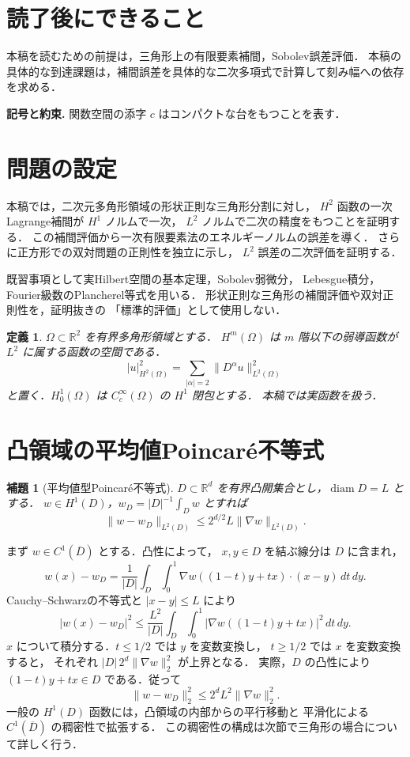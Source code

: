 \documentclass[a5paper,10pt,onecolumn]{jsarticle}
\makeatletter
\theoremstyle{mathnotetheorem}
\newtheorem{definition}[theorem]{定義}
\newtheorem{lemma}[theorem]{補題}
\renewcommand{\proofname}{証明}
\renewenvironment{proof}[1][\proofname]{%
  \par\pushQED{\qed}\normalfont\topsep4\p@\@plus2\p@\relax
  \trivlist\item[\hskip\labelsep\bfseries #1]\ignorespaces
}{\popQED\endtrivlist\@endpefalse}
\newcommand{\norm}[1]{\lVert #1\rVert}
\makeatother
\begin{document}
\section*{読了後にできること}
本稿を読むための前提は，三角形上の有限要素補間，Sobolev誤差評価．
本稿の具体的な到達課題は，補間誤差を具体的な二次多項式で計算して刻み幅への依存を求める．


\par\noindent\textbf{記号と約束.}\quad
関数空間の添字 $c$ はコンパクトな台をもつことを表す．
\par

\section{問題の設定}
本稿では，二次元多角形領域の形状正則な三角形分割に対し，
$H^2$ 函数の一次Lagrange補間が $H^1$ ノルムで一次，
$L^2$ ノルムで二次の精度をもつことを証明する．
この補間評価から一次有限要素法のエネルギーノルムの誤差を導く．
さらに正方形での双対問題の正則性を独立に示し，
$L^2$ 誤差の二次評価を証明する．

既習事項として実Hilbert空間の基本定理，Sobolev弱微分，
Lebesgue積分，Fourier級数のPlancherel等式を用いる．
形状正則な三角形の補間評価や双対正則性を，証明抜きの
「標準的評価」として使用しない．

\begin{definition}
$\Omega\subset\mathbb R^2$ を有界多角形領域とする．
$H^m(\Omega)$ は $m$ 階以下の弱導函数が $L^2$ に属する函数の空間である．
\[
 |u|_{H^2(\Omega)}^2=
  \sum_{|\alpha|=2}\norm{D^\alpha u}_{L^2(\Omega)}^2
\]
と置く．$H_0^1(\Omega)$ は $C_c^\infty(\Omega)$ の $H^1$ 閉包とする．
本稿では実函数を扱う．
\end{definition}

\section{凸領域の平均値Poincar\'e不等式}
\begin{lemma}[平均値型Poincar\'e不等式]
$D\subset\mathbb R^d$ を有界凸開集合とし，$\operatorname{diam}D=L$ とする．
$w\in H^1(D)$，$w_D=|D|^{-1}\int_Dw$ とすれば
\[
 \norm{w-w_D}_{L^2(D)}\le2^{d/2}L\norm{\nabla w}_{L^2(D)}.
\]
\end{lemma}
\begin{proof}
まず $w\in C^1(\overline D)$ とする．凸性によって，
$x,y\in D$ を結ぶ線分は $D$ に含まれ，
\[
 w(x)-w_D=\frac1{|D|}\int_D\int_0^1
   \nabla w((1-t)y+tx)\cdot(x-y)\,dt\,dy.
\]
Cauchy--Schwarzの不等式と $|x-y|\le L$ により
\[
 |w(x)-w_D|^2
 \le\frac{L^2}{|D|}\int_D\int_0^1
  |\nabla w((1-t)y+tx)|^2\,dt\,dy.
\]
$x$ について積分する．$t\le1/2$ では $y$ を変数変換し，
$t\ge1/2$ では $x$ を変数変換すると，
それぞれ $|D|\,2^d\norm{\nabla w}_2^2$ が上界となる．
実際，$D$ の凸性により
$(1-t)y+tx\in D$ である．従って
\[
 \norm{w-w_D}_2^2\le2^d L^2\norm{\nabla w}_2^2.
\]
一般の $H^1(D)$ 函数には，凸領域の内部からの平行移動と
平滑化による $C^1(\overline D)$ の稠密性で拡張する．
この稠密性の構成は次節で三角形の場合について詳しく行う．
\end{proof}
\end{document}
